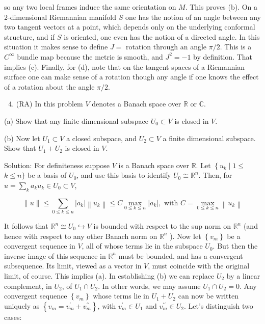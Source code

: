 \documentclass[10pt]{article}
\begin{document}
so any two local frames induce the same orientation on $M$. This proves (b). On a 2-dimensional Riemannian manifold $S$ one has the notion of an angle between any two tangent vectors at a point, which depends only on the underlying conformal structure, and if $S$ is oriented, one even has the notion of a directed angle. In this situation it makes sense to define $J=$ rotation through an angle $\pi / 2$. This is a $C^{\infty}$ bundle map because the metric is smooth, and $J^{2}=-1$ by definition. That implies (c). Finally, for (d), note that on the tangent spaces of a Riemannian surface one can make sense of a rotation though any angle if one knows the effect of a rotation about the angle $\pi / 2$.

\begin{enumerate}
  \setcounter{enumi}{3}
  \item (RA) In this problem $V$ denotes a Banach space over $\mathbb{R}$ or $\mathbb{C}$.
\end{enumerate}

(a) Show that any finite dimensional subspace $U_{0} \subset V$ is closed in $V$.

(b) Now let $U_{1} \subset V$ a closed subspace, and $U_{2} \subset V$ a finite dimensional subspace. Show that $U_{1}+U_{2}$ is closed in $V$.

Solution: For definiteness suppose $V$ is a Banach space over $\mathbb{R}$. Let $\left\{u_{k} \mid 1 \leq\right.$ $k \leq n\}$ be a basis of $U_{0}$, and use this basis to identify $U_{0} \cong \mathbb{R}^{n}$. Then, for $u=\sum_{k} a_{k} u_{k} \in U_{0} \subset V$,

$$
\|u\| \leq \sum_{0 \leq k \leq n}\left|a_{k}\right|\left\|u_{k}\right\| \leq C \max _{0 \leq k \leq n}\left|a_{k}\right|, \text { with } C=\max _{0 \leq k \leq n}\left\|u_{k}\right\|
$$

It follows that $\mathbb{R}^{n} \cong U_{0} \hookrightarrow V$ is bounded with respect to the sup norm on $\mathbb{R}^{n}$ (and hence with respect to any other Banach norm on $\mathbb{R}^{n}$ ). Now let $\left\{v_{m}\right\}$ be a convergent sequence in $V$, all of whose terms lie in the subspace $U_{0}$. But then the inverse image of this sequence in $\mathbb{R}^{n}$ must be bounded, and has a convergent subsequence. Its limit, viewed as a vector in $V$, must coincide with the original limit, of course. This implies (a). In establishing (b) we can replace $U_{2}$ by a linear complement, in $U_{2}$, of $U_{1} \cap U_{2}$. In other words, we may assume $U_{1} \cap U_{2}=0$. Any convergent sequence $\left\{v_{m}\right\}$ whose terms lie in $U_{1}+U_{2}$ can now be written uniquely as $\left\{v_{m}=v_{m}^{\prime}+v_{m}^{\prime \prime}\right\}$, with $v_{m}^{\prime} \in U_{1}$ and $v_{m}^{\prime \prime} \in U_{2}$. Let's distinguish two cases:
\end{document}
